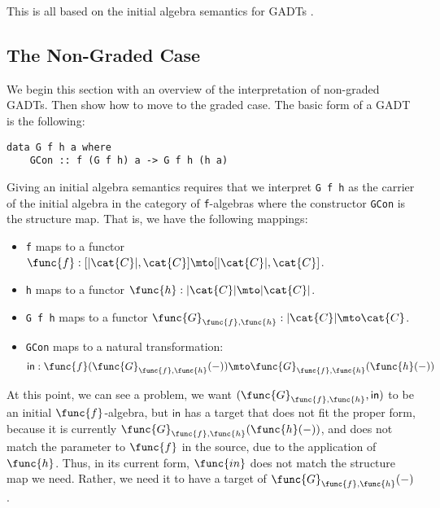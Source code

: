 This is all based on the initial algebra semantics for GADTs
\cite{Johann:2007}.

\subsection{The Non-Graded Case}
\label{subsec:the_non_graded_case}
We begin this section with an overview of the interpretation of
non-graded GADTs.  Then show how to move to the graded case. The basic
form of a GADT is the following:
\begin{verbatim}
data G f h a where
    GCon :: f (G f h) a -> G f h (h a)
\end{verbatim}
Giving an initial algebra semantics requires that we interpret 
\verb!G f h! as the carrier of the initial algebra in the category 
of \verb!f!-algebras where the constructor \verb!GCon! is the 
structure map.  That is, we have the following mappings:
\begin{itemize}
    \item \verb!f! maps to a functor $\func{f} : [|\cat{C}|,\cat{C}]
    \mto [|\cat{C}|, \cat{C}]$.

    \item \verb!h! maps to a functor $\func{h} : |\cat{C}| \mto
    |\cat{C}|$. 

    \item \verb!G f h! maps to a functor 
$\func{G}_{\func{f},\func{h}} : |\cat{C}| \mto \cat{C}$.

    \item \verb!GCon! maps to a natural transformation:
          \[
            \mathsf{in} : \func{f}(\func{G}_{\func{f},\func{h}}(-)) \mto \func{G}_{\func{f},\func{h}}(\func{h}(-))
          \]
\end{itemize}
At this point, we can see a problem, we want $(\func{G}_{\func{f},\func{h}},
\mathsf{in})$ to be an initial $\func{f}$-algebra, but
$\mathsf{in}$ has a target that does not fit the proper form, because
it is currently $\func{G}_{\func{f},\func{h}}(\func{h}(-))$, and
does not match the parameter to $\func{f}$ in the source, due to
the application of $\func{h}$.  Thus, in its current form, $\func{in}$
does not match the structure map we need.  Rather, we need it to have
a target of $\func{G}_{\func{f},\func{h}}(-)$.

